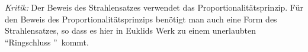 {\em Kritik:} Der Beweis des Strahlensatzes verwendet das Proportionalitätsprinzip. Für den Beweis
des Proportionalitätsprinzips benötigt man auch eine Form des Strahlensatzes, so dass es hier in
Euklids Werk zu einem unerlaubten "`Ringschluss "'\ kommt.


